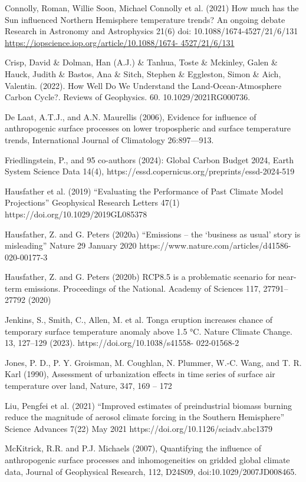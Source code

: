 \documentclass[12pt,paper=a4,DIV=12,parskip=never,chapterprefix=false,headings=standardclasses]{scrreprt}
\numberwithin{figure}{chapter}
\begin{document}
Connolly, Roman, Willie Soon, Michael Connolly et al. (2021) How much has the Sun influenced
Northern Hemisphere temperature trends? An ongoing debate Research in Astronomy and
Astrophysics 21(6) doi: 10.1088/1674-4527/21/6/131 \url{https://iopscience.iop.org/article/10.1088/1674-
4527/21/6/131}

Crisp, David \& Dolman, Han (A.J.) \& Tanhua, Toste \& Mckinley, Galen \& Hauck, Judith \& Bastos, Ana
\& Sitch, Stephen \& Eggleston, Simon \& Aich, Valentin. (2022). How Well Do We Understand the
Land‐Ocean‐Atmosphere Carbon Cycle?. Reviews of Geophysics. 60. 10.1029/2021RG000736.

De Laat, A.T.J., and A.N. Maurellis (2006), Evidence for influence of anthropogenic surface processes on
lower tropospheric and surface temperature trends, International Journal of Climatology 26:897—913.

Friedlingstein, P., and 95 co-authors (2024): Global Carbon Budget 2024, Earth System Science Data
14(4), https://essd.copernicus.org/preprints/essd-2024-519

Hausfather et al. (2019) “Evaluating the Performance of Past Climate Model Projections” Geophysical
Research Letters 47(1) https://doi.org/10.1029/2019GL085378

Hausfather, Z. and G. Peters (2020a) “Emissions – the ‘business as usual’ story is misleading” Nature 29
January 2020 https://www.nature.com/articles/d41586-020-00177-3

Hausfather, Z. and G. Peters (2020b) RCP8.5 is a problematic scenario for near-term emissions.
Proceedings of the National. Academy of Sciences 117, 27791–27792 (2020)

Jenkins, S., Smith, C., Allen, M. et al. Tonga eruption increases chance of temporary surface temperature
anomaly above 1.5 °C. Nature Climate Change. 13, 127–129 (2023). https://doi.org/10.1038/s41558-
022-01568-2

Jones, P. D., P. Y. Groisman, M. Coughlan, N. Plummer, W.-C. Wang, and T. R. Karl (1990),
Assessment of urbanization effects in time series of surface air temperature over land, Nature, 347,
169 – 172

Liu, Pengfei et al. (2021) “Improved estimates of preindustrial biomass burning reduce the magnitude of
aerosol climate forcing in the Southern Hemisphere” Science Advances 7(22) May 2021
https://doi.org/10.1126/sciadv.abc1379

McKitrick, R.R. and P.J. Michaels (2007), Quantifying the influence of anthropogenic surface processes
and inhomogeneities on gridded global climate data, Journal of Geophysical Research, 112, D24S09,
doi:10.1029/2007JD008465.
\end{document}

